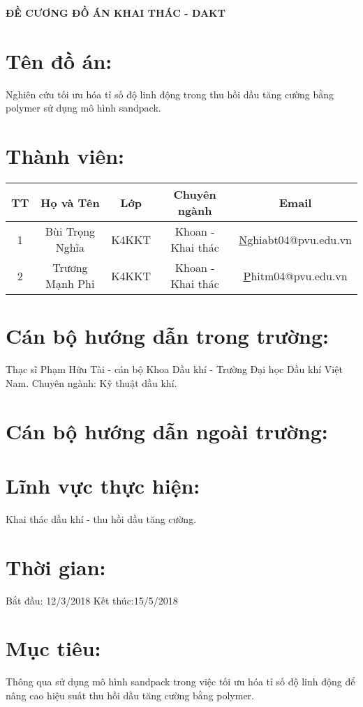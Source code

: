 \documentclass[12pt,a4paper]{article}
\begin{document}
	\begin{center}
		\textbf{\LARGE{ĐỀ CƯƠNG ĐỒ ÁN KHAI THÁC - DAKT}}
	\end{center}

\section{Tên đồ án:}
Nghiên cứu tối ưu hóa tỉ số độ linh động trong thu hồi dầu tăng cường bằng polymer sử dụng mô hình sandpack.
\section{Thành viên:}
\begin{table}[h]
\centering
\begin{tabular}{|c|c|c|c|c|}
\hline
\textbf{TT} & \textbf{Họ và Tên} & \textbf{Lớp} & \textbf{Chuyên ngành} & \textbf{Email}                                    \\ \hline
1           & Bùi Trọng Nghĩa    & K4KKT        & Khoan - Khai thác     & {\color[HTML]{3531FF} {\ul Nghiabt04@pvu.edu.vn}} \\ \hline
2           & Trương Mạnh Phi    & K4KKT        & Khoan - Khai thác     & {\color[HTML]{3531FF} {\ul Phitm04@pvu.edu.vn}}   \\ \hline
\end{tabular}
\end{table}
\section{Cán bộ hướng dẫn trong trường:}
Thạc sĩ Phạm Hữu Tài - cán bộ Khoa Dầu khí - Trường Đại học Dầu khí Việt Nam.
Chuyên ngành: Kỹ thuật dầu khí.
\section{Cán bộ hướng dẫn ngoài trường:}
\section{Lĩnh vực thực hiện:}
Khai thác dầu khí - thu hồi dầu tăng cường.
\section{Thời gian:}
Bắt đầu: 12/3/2018		Kết thúc:15/5/2018
\section{Mục tiêu:}
	Thông qua sử dụng mô hình sandpack trong việc tối ưu hóa tỉ số độ linh động để nâng cao hiệu suất thu hồi dầu tăng cường bằng polymer.
\end{document}
